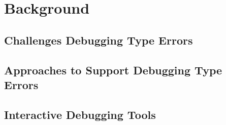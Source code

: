 


\chapter{Background}
\label{chapter2} 


\section{Challenges Debugging Type Errors}

\section{Approaches to Support Debugging Type Errors}

\section{Interactive Debugging Tools}